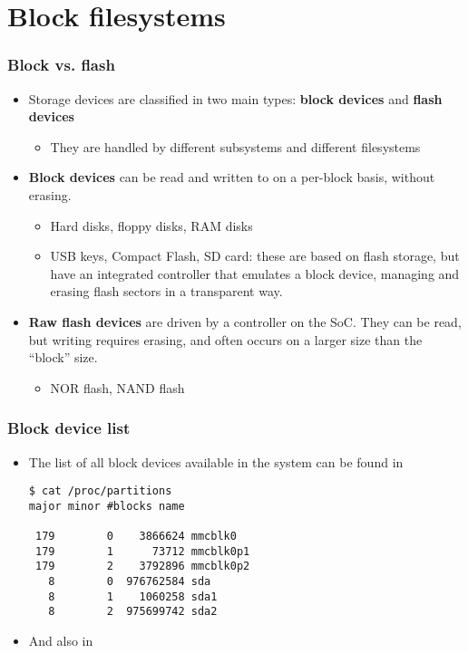 \section{Block filesystems}

\begin{frame}
  \frametitle{Block vs. flash}
  \begin{itemize}
  \item Storage devices are classified in two main types: {\bf block
      devices} and {\bf flash devices}
    \begin{itemize}
    \item They are handled by different subsystems and different
      filesystems
    \end{itemize}
  \item {\bf Block devices} can be read and written to on a per-block
    basis, without erasing.
    \begin{itemize}
    \item Hard disks, floppy disks, RAM disks
    \item USB keys, Compact Flash, SD card: these are based on
      flash storage, but have an integrated controller that emulates a block
      device, managing and erasing flash sectors in a transparent way.
    \end{itemize}
  \item {\bf Raw flash devices} are driven by a controller on the
      SoC. They can be read, but writing requires erasing, and often occurs
      on a larger size than the “block” size.
    \begin{itemize}
    \item NOR flash, NAND flash
    \end{itemize}
  \end{itemize}
\end{frame}

\begin{frame}[fragile]
  \frametitle{Block device list}
  \begin{itemize}
  \item The list of all block devices available in the system can be
    found in \\
\begin{verbatim}
$ cat /proc/partitions
major minor #blocks name

 179        0    3866624 mmcblk0
 179        1      73712 mmcblk0p1
 179        2    3792896 mmcblk0p2
   8        0  976762584 sda
   8        1    1060258 sda1
   8        2  975699742 sda2
\end{verbatim}
  \item And also in 
  \end{itemize}
\end{frame}

